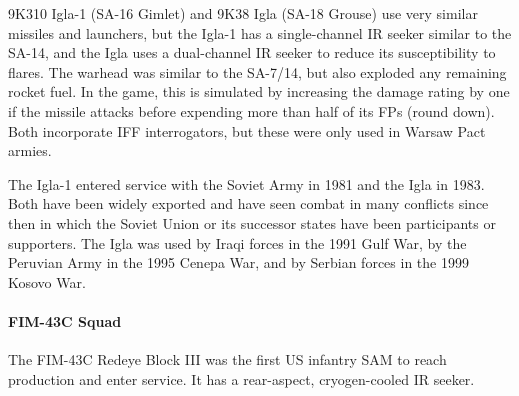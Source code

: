 9K310 Igla-1 (SA-16 Gimlet) and 9K38 Igla (SA-18 Grouse) use very similar missiles and launchers, but the Igla-1 has a single-channel IR seeker similar to the SA-14, and the Igla uses a dual-channel IR seeker to reduce its susceptibility to flares.
The warhead was similar to the SA-7/14, but also exploded any remaining rocket fuel.
In the game, this is simulated by increasing the damage rating by one if the missile attacks before expending more than half of its FPs (round down).
Both incorporate IFF interrogators, but these were only used in Warsaw Pact armies.%

The Igla-1 entered service with the Soviet Army in 1981 and the Igla in 1983.
Both have been widely exported and have seen combat in many conflicts since then in which the Soviet Union or its successor states have been participants or supporters.
The Igla was used by Iraqi forces in the 1991 Gulf War, by the Peruvian Army in the 1995 Cenepa War, and by Serbian forces in the 1999 Kosovo War.

\paragraph{FIM-43C Squad}

The FIM-43C Redeye Block III was the first US infantry SAM to reach production and enter service.
It has a rear-aspect, cryogen-cooled IR seeker.%

